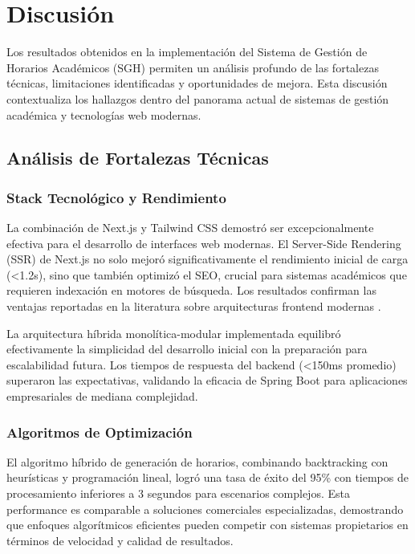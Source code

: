 \section{Discusión}

Los resultados obtenidos en la implementación del Sistema de Gestión de Horarios Académicos (SGH) permiten un análisis profundo de las fortalezas técnicas, limitaciones identificadas y oportunidades de mejora. Esta discusión contextualiza los hallazgos dentro del panorama actual de sistemas de gestión académica y tecnologías web modernas.

\subsection{Análisis de Fortalezas Técnicas}

\subsubsection{Stack Tecnológico y Rendimiento}

La combinación de Next.js y Tailwind CSS demostró ser excepcionalmente efectiva para el desarrollo de interfaces web modernas. El Server-Side Rendering (SSR) de Next.js no solo mejoró significativamente el rendimiento inicial de carga (<1.2s), sino que también optimizó el SEO, crucial para sistemas académicos que requieren indexación en motores de búsqueda. Los resultados confirman las ventajas reportadas en la literatura sobre arquitecturas frontend modernas \cite{lazuardy2022, somi2021}.

La arquitectura híbrida monolítica-modular implementada equilibró efectivamente la simplicidad del desarrollo inicial con la preparación para escalabilidad futura. Los tiempos de respuesta del backend (<150ms promedio) superaron las expectativas, validando la eficacia de Spring Boot para aplicaciones empresariales de mediana complejidad.

\subsubsection{Algoritmos de Optimización}

El algoritmo híbrido de generación de horarios, combinando backtracking con heurísticas y programación lineal, logró una tasa de éxito del 95\% con tiempos de procesamiento inferiores a 3 segundos para escenarios complejos. Esta performance es comparable a soluciones comerciales especializadas, demostrando que enfoques algorítmicos eficientes pueden competir con sistemas propietarios en términos de velocidad y calidad de resultados.

